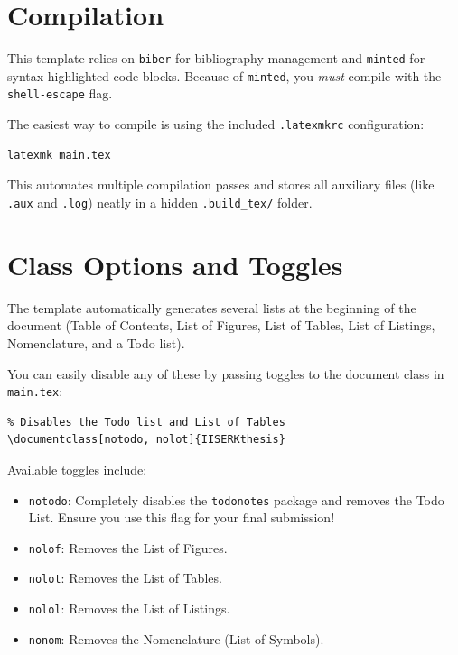 \section{Compilation}
This template relies on \texttt{biber} for bibliography management and \texttt{minted} for syntax-highlighted code blocks. Because of \texttt{minted}, you \emph{must} compile with the \texttt{-shell-escape} flag.

The easiest way to compile is using the included \texttt{.latexmkrc} configuration:
\begin{verbatim}
latexmk main.tex
\end{verbatim}
This automates multiple compilation passes and stores all auxiliary files (like \texttt{.aux} and \texttt{.log}) neatly in a hidden \texttt{.build_tex/} folder.

\section{Class Options and Toggles}
\label{sec:class_options}
The template automatically generates several lists at the beginning of the document (Table of Contents, List of Figures, List of Tables, List of Listings, Nomenclature, and a Todo list).

You can easily disable any of these by passing toggles to the document class in \texttt{main.tex}:
\begin{verbatim}
% Disables the Todo list and List of Tables
\documentclass[notodo, nolot]{IISERKthesis}
\end{verbatim}

Available toggles include:
\begin{itemize}
    \item \texttt{notodo}: Completely disables the \texttt{todonotes} package and removes the Todo List. Ensure you use this flag for your final submission!
    \item \texttt{nolof}: Removes the List of Figures.
    \item \texttt{nolot}: Removes the List of Tables.
    \item \texttt{nolol}: Removes the List of Listings.
    \item \texttt{nonom}: Removes the Nomenclature (List of Symbols).
\end{itemize}
